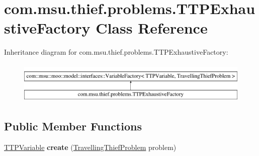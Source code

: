 \hypertarget{classcom_1_1msu_1_1thief_1_1problems_1_1TTPExhaustiveFactory}{\section{com.\-msu.\-thief.\-problems.\-T\-T\-P\-Exhaustive\-Factory Class Reference}
\label{classcom_1_1msu_1_1thief_1_1problems_1_1TTPExhaustiveFactory}
}
Inheritance diagram for com.\-msu.\-thief.\-problems.\-T\-T\-P\-Exhaustive\-Factory\-:\begin{figure}[H]
\begin{center}
\leavevmode
\includegraphics[height=2.000000cm]{classcom_1_1msu_1_1thief_1_1problems_1_1TTPExhaustiveFactory}
\end{center}
\end{figure}
\subsection*{Public Member Functions}
\begin{DoxyCompactItemize}
\item 
\hypertarget{classcom_1_1msu_1_1thief_1_1problems_1_1TTPExhaustiveFactory_a831d81cded0de2536f45611061d85503}{\hyperlink{classcom_1_1msu_1_1thief_1_1variable_1_1TTPVariable}{T\-T\-P\-Variable} {\bfseries create} (\hyperlink{classcom_1_1msu_1_1thief_1_1problems_1_1TravellingThiefProblem}{Travelling\-Thief\-Problem} problem)}\label{classcom_1_1msu_1_1thief_1_1problems_1_1TTPExhaustiveFactory_a831d81cded0de2536f45611061d85503}

\end{DoxyCompactItemize}
